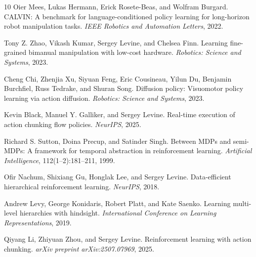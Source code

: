\documentclass[10pt,twocolumn,letterpaper]{article}
\begin{document}
\begin{thebibliography}{10}
Oier Mees, Lukas Hermann, Erick Rosete-Beas, and Wolfram Burgard.
\newblock CALVIN: A benchmark for language-conditioned policy learning for long-horizon robot manipulation tasks.
\newblock \emph{IEEE Robotics and Automation Letters}, 2022.

Tony Z. Zhao, Vikash Kumar, Sergey Levine, and Chelsea Finn.
\newblock Learning fine-grained bimanual manipulation with low-cost hardware.
\newblock \emph{Robotics: Science and Systems}, 2023.

Cheng Chi, Zhenjia Xu, Siyuan Feng, Eric Cousineau, Yilun Du, Benjamin Burchfiel, Russ Tedrake, and Shuran Song.
\newblock Diffusion policy: Visuomotor policy learning via action diffusion.
\newblock \emph{Robotics: Science and Systems}, 2023.

Kevin Black, Manuel Y. Galliker, and Sergey Levine.
\newblock Real-time execution of action chunking flow policies.
\newblock \emph{NeurIPS}, 2025.

Richard S. Sutton, Doina Precup, and Satinder Singh.
\newblock Between MDPs and semi-MDPs: A framework for temporal abstraction in reinforcement learning.
\newblock \emph{Artificial Intelligence}, 112(1--2):181--211, 1999.

Ofir Nachum, Shixiang Gu, Honglak Lee, and Sergey Levine.
\newblock Data-efficient hierarchical reinforcement learning.
\newblock \emph{NeurIPS}, 2018.

Andrew Levy, George Konidaris, Robert Platt, and Kate Saenko.
\newblock Learning multi-level hierarchies with hindsight.
\newblock \emph{International Conference on Learning Representations}, 2019.

Qiyang Li, Zhiyuan Zhou, and Sergey Levine.
\newblock Reinforcement learning with action chunking.
\newblock \emph{arXiv preprint arXiv:2507.07969}, 2025.

\end{thebibliography}
\end{document}

